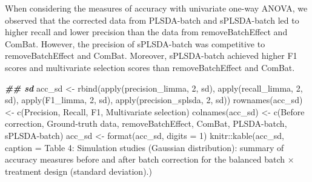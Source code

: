 \documentclass[
]{book}
\newenvironment{Shaded}{\begin{snugshade}}{\end{snugshade}}
\newcommand{\AttributeTok}[1]{\textcolor[rgb]{0.77,0.63,0.00}{#1}}
\newcommand{\DecValTok}[1]{\textcolor[rgb]{0.00,0.00,0.81}{#1}}
\newcommand{\DocumentationTok}[1]{\textcolor[rgb]{0.56,0.35,0.01}{\textbf{\textit{#1}}}}
\newcommand{\FunctionTok}[1]{\textcolor[rgb]{0.00,0.00,0.00}{#1}}
\newcommand{\NormalTok}[1]{#1}
\newcommand{\OtherTok}[1]{\textcolor[rgb]{0.56,0.35,0.01}{#1}}
\newcommand{\SpecialCharTok}[1]{\textcolor[rgb]{0.00,0.00,0.00}{#1}}
\newcommand{\StringTok}[1]{\textcolor[rgb]{0.31,0.60,0.02}{#1}}
\begin{document}
When considering the measures of accuracy with univariate one-way ANOVA, we observed that the corrected data from PLSDA-batch and sPLSDA-batch led to higher recall and lower precision than the data from removeBatchEffect and ComBat. However, the precision of sPLSDA-batch was competitive to removeBatchEffect and ComBat. Moreover, sPLSDA-batch achieved higher F1 scores and multivariate selection scores than removeBatchEffect and ComBat.

\begin{Shaded}
\begin{Highlighting}[]
\DocumentationTok{\#\# sd}
\NormalTok{acc\_sd }\OtherTok{\textless{}{-}} \FunctionTok{rbind}\NormalTok{(}\FunctionTok{apply}\NormalTok{(precision\_limma, }\DecValTok{2}\NormalTok{, sd), }\FunctionTok{apply}\NormalTok{(recall\_limma, }\DecValTok{2}\NormalTok{, sd), }
                \FunctionTok{apply}\NormalTok{(F1\_limma, }\DecValTok{2}\NormalTok{, sd), }\FunctionTok{apply}\NormalTok{(precision\_splsda, }\DecValTok{2}\NormalTok{, sd))}
\FunctionTok{rownames}\NormalTok{(acc\_sd) }\OtherTok{\textless{}{-}} \FunctionTok{c}\NormalTok{(}\StringTok{\textquotesingle{}Precision\textquotesingle{}}\NormalTok{, }\StringTok{\textquotesingle{}Recall\textquotesingle{}}\NormalTok{, }\StringTok{\textquotesingle{}F1\textquotesingle{}}\NormalTok{, }\StringTok{\textquotesingle{}Multivariate selection\textquotesingle{}}\NormalTok{)}
\FunctionTok{colnames}\NormalTok{(acc\_sd) }\OtherTok{\textless{}{-}} \FunctionTok{c}\NormalTok{(}\StringTok{\textquotesingle{}Before correction\textquotesingle{}}\NormalTok{, }\StringTok{\textquotesingle{}Ground{-}truth data\textquotesingle{}}\NormalTok{, }
                      \StringTok{\textquotesingle{}removeBatchEffect\textquotesingle{}}\NormalTok{, }\StringTok{\textquotesingle{}ComBat\textquotesingle{}}\NormalTok{, }
                      \StringTok{\textquotesingle{}PLSDA{-}batch\textquotesingle{}}\NormalTok{, }\StringTok{\textquotesingle{}sPLSDA{-}batch\textquotesingle{}}\NormalTok{)}
\NormalTok{acc\_sd }\OtherTok{\textless{}{-}} \FunctionTok{format}\NormalTok{(acc\_sd, }\AttributeTok{digits =} \DecValTok{1}\NormalTok{)}
\NormalTok{knitr}\SpecialCharTok{::}\FunctionTok{kable}\NormalTok{(acc\_sd, }\AttributeTok{caption =} \StringTok{\textquotesingle{}Table 4: Simulation studies (Gaussian distribution): summary of accuracy measures before and after batch correction for the balanced batch × treatment design (standard deviation).\textquotesingle{}}\NormalTok{)}
\end{Highlighting}
\end{Shaded}
\end{document}
